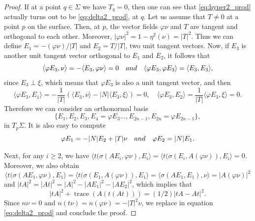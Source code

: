 \documentclass[10pt,a4paper]{amsart}
\DeclareMathOperator{\trace}{trace} \DeclareMathOperator{\di}{div}
\begin{document}
\begin{proof} If at a point $q\in\Sigma$ we have $T_q=0$, then one can see that \eqref{eq:hyper2_prod} actually turns out to be \eqref{eq:delta2_prod}, at $q$. Let us assume that $T\neq 0$  at a point $p$ on the surface. Then, at $p$, the vector fields $\varphi\nu$ and $T$ are tangent and orthogonal to each other. Moreover, $|\varphi\nu|^2=1-\eta^2(\nu)=|T|^2$. Thus we can define $E_1=-(\varphi\nu)/|T|$ and $E_2=T/|T|$, two unit tangent vectors. Now, if $E_3$ is another unit tangent vector orthogonal to $E_1$ and $E_2$, it follows that
$$
\langle\varphi E_3,\nu\rangle=-\langle E_3,\varphi\nu\rangle=0\quad\textnormal{and}\quad \langle\varphi E_3,\varphi E_3\rangle=\langle E_3,E_3\rangle,
$$
since $E_3\perp\xi$, which means that $\varphi E_3$ is also a unit tangent vector, and then
$$
\langle\varphi E_3,E_1\rangle=-\frac{1}{|T|}(\langle E_3,\nu\rangle-|N|\langle E_3,\xi\rangle)=0,\quad\langle\varphi E_3,E_2\rangle=\frac{1}{|T|}\langle\varphi E_3,\xi\rangle=0.
$$ 
Therefore we can consider an orthonormal basis
$$
\{E_1,E_2,E_3,E_4=\varphi E_3\ldots,E_{2n-1},E_{2n}=\varphi E_{2n-1}\},
$$
in $T_p\Sigma$. It is also easy to compute 
$$
\varphi E_1=-|N|E_2+|T|\nu\quad\textnormal{and}\quad\varphi E_2=|N|E_1.
$$

Next, for any $i\geq 2$, we have $\langle t(\sigma(AE_i,\varphi\nu),E_i\rangle=\langle t(\sigma(E_i,A(\varphi\nu)),E_i\rangle=0$. Moreover, we also obtain 
$$
\langle t(\sigma(AE_1,\varphi\nu),E_1\rangle=\langle t(\sigma(E_1,A(\varphi\nu)),E_1\rangle=\langle\sigma(AE_1,E_1),\nu\rangle=|A(\varphi\nu)|^2
$$
and $|tA|^2=|At|^2=|A|^2-|AE_1|^2-|AE_2|^2$, which implies that 
$$
|tA|^2+\trace(A(t(At)))=(1/2)|tA-At|^2.
$$
Since $n\nu=0$ and $n(t\nu)=n(\varphi\nu)=-|T|^2\nu$, we replace in equation \eqref{eq:delta2_prod} and conclude the proof.
\end{proof} 
\end{document}
